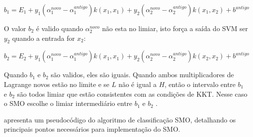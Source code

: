 \begin{equation}
b_{1} = E_{1} + y_{1}(\alpha_{1}^{novo} - \alpha_{1}^{antigo})k(x_{1},x_{1})+y_{2}(\alpha_{2}^{novo} - \alpha_{2}^{antigo})k(x_{1},x_{2})+b^{antigo}
\end{equation}

O valor $b_{2}$ é valido quando  $\alpha_{2}^{novo}$ não esta no limiar, isto força a saída do SVM ser $y_{2}$ quando a entrada for $x_{2}$:

\begin{equation}
b_{2} = E_{2} + y_{1}(\alpha_{1}^{novo} - \alpha_{1}^{antigo})k(x_{1},x_{1})+y_{2}(\alpha_{2}^{novo} - \alpha_{2}^{antigo})k(x_{2},x_{2})+b^{antigo}
\end{equation}

Quando $b_{1}$ e $b_{2}$ são validos, eles são iguais. Quando ambos multiplicadores de Lagrange novos estão no limite e se $L$ não é igual a $H$, então o intervalo entre $b_{1}$ e $b_{2}$ são todos limiar que estão consistentes com as condições de KKT. Nesse caso o SMO escolhe o limiar intermediário entre $b_{1}$ e $b_{2}$ \cite{Platt1999}. 

\cite{Platt1999} apresenta um pseudocódigo do algoritmo de classificação SMO, detalhando os principais pontos necessários para implementação do SMO.